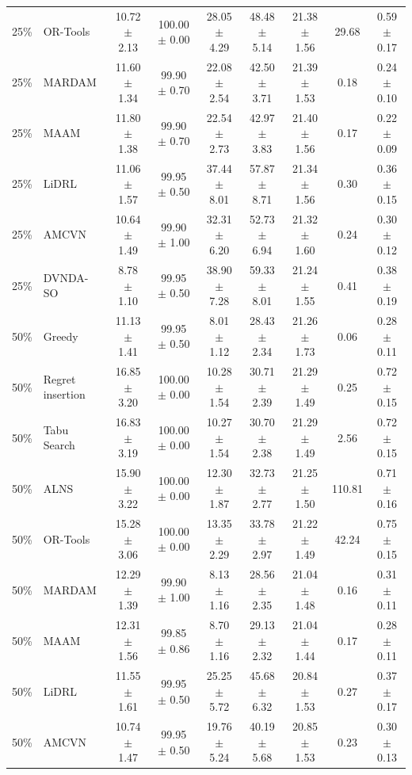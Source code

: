 \begin{tabular}{clccccccc}
25\% & OR-Tools & 10.72 $\pm$ 2.13 & 100.00 $\pm$ 0.00 & 28.05 $\pm$ 4.29 & 48.48 $\pm$ 5.14 & 21.38 $\pm$ 1.56 & 29.68 & 0.59 $\pm$ 0.17 \\
25\% & MARDAM & 11.60 $\pm$ 1.34 & 99.90 $\pm$ 0.70 & 22.08 $\pm$ 2.54 & 42.50 $\pm$ 3.71 & 21.39 $\pm$ 1.53 & 0.18 & 0.24 $\pm$ 0.10 \\
25\% & MAAM & 11.80 $\pm$ 1.38 & 99.90 $\pm$ 0.70 & 22.54 $\pm$ 2.73 & 42.97 $\pm$ 3.83 & 21.40 $\pm$ 1.56 & 0.17 & 0.22 $\pm$ 0.09 \\
25\% & LiDRL & 11.06 $\pm$ 1.57 & 99.95 $\pm$ 0.50 & 37.44 $\pm$ 8.01 & 57.87 $\pm$ 8.71 & 21.34 $\pm$ 1.56 & 0.30 & 0.36 $\pm$ 0.15 \\
25\% & AMCVN & 10.64 $\pm$ 1.49 & 99.90 $\pm$ 1.00 & 32.31 $\pm$ 6.20 & 52.73 $\pm$ 6.94 & 21.32 $\pm$ 1.60 & 0.24 & 0.30 $\pm$ 0.12 \\
25\% & DVNDA-SO & 8.78 $\pm$ 1.10 & 99.95 $\pm$ 0.50 & 38.90 $\pm$ 7.28 & 59.33 $\pm$ 8.01 & 21.24 $\pm$ 1.55 & 0.41 & 0.38 $\pm$ 0.19 \\
50\% & Greedy & 11.13 $\pm$ 1.41 & 99.95 $\pm$ 0.50 & 8.01 $\pm$ 1.12 & 28.43 $\pm$ 2.34 & 21.26 $\pm$ 1.73 & 0.06 & 0.28 $\pm$ 0.11 \\
50\% & Regret insertion & 16.85 $\pm$ 3.20 & 100.00 $\pm$ 0.00 & 10.28 $\pm$ 1.54 & 30.71 $\pm$ 2.39 & 21.29 $\pm$ 1.49 & 0.25 & 0.72 $\pm$ 0.15 \\
50\% & Tabu Search & 16.83 $\pm$ 3.19 & 100.00 $\pm$ 0.00 & 10.27 $\pm$ 1.54 & 30.70 $\pm$ 2.38 & 21.29 $\pm$ 1.49 & 2.56 & 0.72 $\pm$ 0.15 \\
50\% & ALNS & 15.90 $\pm$ 3.22 & 100.00 $\pm$ 0.00 & 12.30 $\pm$ 1.87 & 32.73 $\pm$ 2.77 & 21.25 $\pm$ 1.50 & 110.81 & 0.71 $\pm$ 0.16 \\
50\% & OR-Tools & 15.28 $\pm$ 3.06 & 100.00 $\pm$ 0.00 & 13.35 $\pm$ 2.29 & 33.78 $\pm$ 2.97 & 21.22 $\pm$ 1.49 & 42.24 & 0.75 $\pm$ 0.15 \\
50\% & MARDAM & 12.29 $\pm$ 1.39 & 99.90 $\pm$ 1.00 & 8.13 $\pm$ 1.16 & 28.56 $\pm$ 2.35 & 21.04 $\pm$ 1.48 & 0.16 & 0.31 $\pm$ 0.11 \\
50\% & MAAM & 12.31 $\pm$ 1.56 & 99.85 $\pm$ 0.86 & 8.70 $\pm$ 1.16 & 29.13 $\pm$ 2.32 & 21.04 $\pm$ 1.44 & 0.17 & 0.28 $\pm$ 0.11 \\
50\% & LiDRL & 11.55 $\pm$ 1.61 & 99.95 $\pm$ 0.50 & 25.25 $\pm$ 5.72 & 45.68 $\pm$ 6.32 & 20.84 $\pm$ 1.53 & 0.27 & 0.37 $\pm$ 0.17 \\
50\% & AMCVN & 10.74 $\pm$ 1.47 & 99.95 $\pm$ 0.50 & 19.76 $\pm$ 5.24 & 40.19 $\pm$ 5.68 & 20.85 $\pm$ 1.53 & 0.23 & 0.30 $\pm$ 0.13 \\

\end{tabular}
